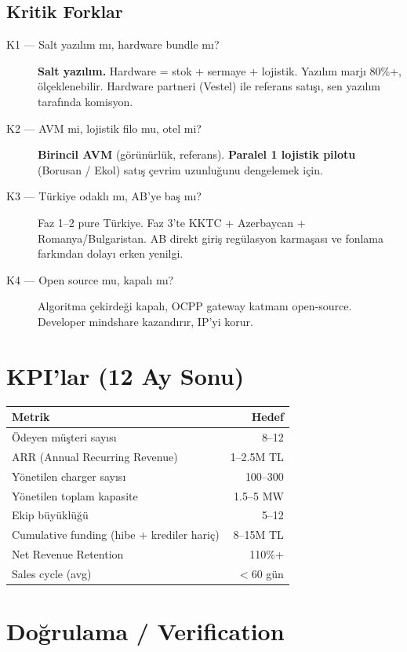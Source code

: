 \documentclass[11pt,a4paper]{article}
\begin{document}
\subsection{Kritik Forklar}
\begin{description}
    \item[K1 --- Salt yazılım mı, hardware bundle mı?] \textbf{Salt yazılım.} Hardware = stok + sermaye + lojistik. Yazılım marjı 80\%+, ölçeklenebilir. Hardware partneri (Vestel) ile referans satışı, sen yazılım tarafında komisyon.
    \item[K2 --- AVM mi, lojistik filo mu, otel mi?] \textbf{Birincil AVM} (görünürlük, referans). \textbf{Paralel 1 lojistik pilotu} (Borusan / Ekol) satış çevrim uzunluğunu dengelemek için.
    \item[K3 --- Türkiye odaklı mı, AB'ye baş mı?] Faz 1--2 pure Türkiye. Faz 3'te KKTC + Azerbaycan + Romanya/Bulgaristan. AB direkt giriş regülasyon karmaşası ve fonlama farkından dolayı erken yenilgi.
    \item[K4 --- Open source mu, kapalı mı?] Algoritma çekirdeği kapalı, OCPP gateway katmanı open-source. Developer mindshare kazandırır, IP'yi korur.
\end{description}

\section{KPI'lar (12 Ay Sonu)}

\begin{tabularx}{\textwidth}{X r}
\toprule
\textbf{Metrik} & \textbf{Hedef} \\
\midrule
Ödeyen müşteri sayısı & 8--12 \\
ARR (Annual Recurring Revenue) & 1--2.5M TL \\
Yönetilen charger sayısı & 100--300 \\
Yönetilen toplam kapasite & 1.5--5 MW \\
Ekip büyüklüğü & 5--12 \\
Cumulative funding (hibe + krediler hariç) & 8--15M TL \\
Net Revenue Retention & 110\%+ \\
Sales cycle (avg) & $<$60 gün \\
\bottomrule
\end{tabularx}

\section{Doğrulama / Verification}
\end{document}
